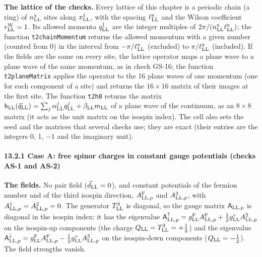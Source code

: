 \documentclass[
  10pt,
]{article}
\begin{document}
\textbf{The lattice of the checks.} Every lattice of this chapter is a
periodic chain (a ring) of \(n^{\rm x}_{\rm LL}\) sites along
\(x^1_{\rm LL}\), with the spacing \(\ell^{\rm x}_{\rm LL}\) and the
Wilson coefficient \(r^{\rm W}_{\rm LL}=1\). Its allowed momenta
\(q^1_{\rm LL}\) are the integer multiples of
\(2\pi/(n^{\rm x}_{\rm LL}\ell^{\rm x}_{\rm LL})\); the function
\texttt{t2chainMomentum} returns the allowed momentum with a given
number (counted from 0) in the interval from
\(-\pi/\ell^{\rm x}_{\rm LL}\) (excluded) to
\(\pi/\ell^{\rm x}_{\rm LL}\) (included). If the fields are the same on
every site, the lattice operator maps a plane wave to a plane wave of
the same momentum, as in check GS-16; the function
\texttt{t2planeMatrix} applies the operator to the 16 plane waves of one
momentum (one for each component of a site) and returns the
\(16\times16\) matrix of their images at the first site. The function
\texttt{t2h8} returns the matrix
\(\mathsf h_{\rm LL}(\vec q_{\rm LL})=\sum_j\alpha^j_{\rm LL}q^j_{\rm LL}+\beta_{\rm LL}m_{\rm LL}\)
of a plane wave of the continuum, as an \(8\times8\) matrix (it acts as
the unit matrix on the isospin index). The cell also sets the seed and
the matrices that several checks use; they are exact (their entries are
the integers 0, 1, \(-1\) and the imaginary unit).

\hypertarget{case-a-free-spinor-charges-in-constant-gauge-potentials-checks-as-1-and-as-2}{%
\paragraph{13.2.1 Case A: free spinor charges in constant gauge
potentials (checks AS-1 and
AS-2)}\label{case-a-free-spinor-charges-in-constant-gauge-potentials-checks-as-1-and-as-2}}

\textbf{The fields.} No pair field (\(\vec d_{\rm LL}=0\)), and constant
potentials of the fermion number and of the third isospin direction,
\(A^{\rm F}_{{\rm LL},p}\) and \(A^3_{{\rm LL},p}\), with
\(A^1_{{\rm LL},p}=A^2_{{\rm LL},p}=0\). The generator \(T^3_{\rm LL}\)
is diagonal, so the gauge matrix \(\mathsf A_{{\rm LL},p}\) is diagonal
in the isospin index: it has the eigenvalue
\(\mathsf A^\uparrow_{{\rm LL},p}=g^{\rm F}_{\rm LL}A^{\rm F}_{{\rm LL},p}+\tfrac12g^{\rm v}_{\rm LL}A^3_{{\rm LL},p}\)
on the isospin-up components (the charge
\(Q_{\rm LL}=T^3_{\rm LL}=+\tfrac12\)) and the eigenvalue
\(\mathsf A^\downarrow_{{\rm LL},p}=g^{\rm F}_{\rm LL}A^{\rm F}_{{\rm LL},p}-\tfrac12g^{\rm v}_{\rm LL}A^3_{{\rm LL},p}\)
on the isospin-down components (\(Q_{\rm LL}=-\tfrac12\)). The field
strengths vanish.
\end{document}
